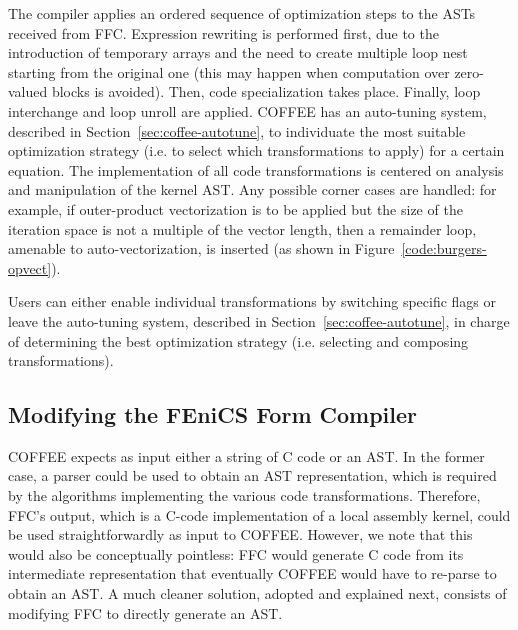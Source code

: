 The compiler applies an ordered sequence of optimization steps to the ASTs received from FFC. Expression rewriting is performed first, due to the introduction of temporary arrays and the need to create multiple loop nest starting from the original one (this may happen when computation over zero-valued blocks is avoided). Then, code specialization takes place. Finally, loop interchange and loop unroll are applied. COFFEE has an auto-tuning system, described in Section~\ref{sec:coffee-autotune}, to individuate the most suitable optimization strategy (i.e. to select which transformations to apply) for a certain equation. The implementation of all code transformations is centered on analysis and manipulation of the kernel AST. Any possible corner cases are handled: for example, if outer-product vectorization is to be applied but the size of the iteration space is not a multiple of the vector length, then a remainder loop, amenable to auto-vectorization, is inserted (as shown in Figure~\ref{code:burgers-opvect}).

Users can either enable individual transformations by switching specific flags or leave the auto-tuning system, described in Section~\ref{sec:coffee-autotune}, in charge of determining the best optimization strategy (i.e. selecting and composing transformations).

\subsection{Modifying the FEniCS Form Compiler}
COFFEE expects as input either a string of C code or an AST. In the former case, a parser could be used to obtain an AST representation, which is required by the algorithms implementing the various code transformations. Therefore, FFC's output, which is a C-code implementation of a local assembly kernel, could be used straightforwardly as input to COFFEE. However, we note that this would also be conceptually pointless: FFC would generate C code from its intermediate representation that eventually COFFEE would have to re-parse to obtain an AST. A much cleaner solution, adopted and explained next, consists of modifying FFC to directly generate an AST. 

